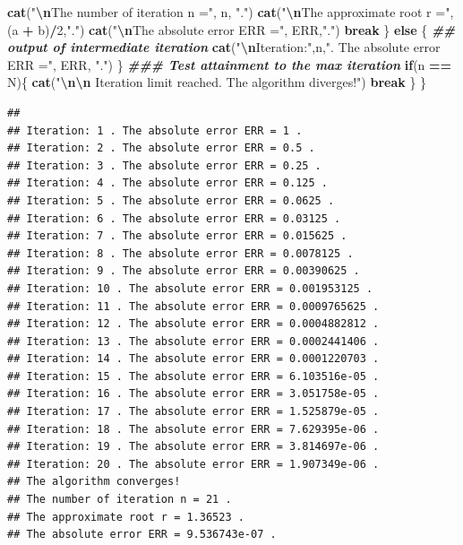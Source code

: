 \documentclass[
]{book}
\newenvironment{Shaded}{\begin{snugshade}}{\end{snugshade}}
\newcommand{\ControlFlowTok}[1]{\textcolor[rgb]{0.13,0.29,0.53}{\textbf{#1}}}
\newcommand{\DecValTok}[1]{\textcolor[rgb]{0.00,0.00,0.81}{#1}}
\newcommand{\DocumentationTok}[1]{\textcolor[rgb]{0.56,0.35,0.01}{\textbf{\textit{#1}}}}
\newcommand{\FunctionTok}[1]{\textcolor[rgb]{0.13,0.29,0.53}{\textbf{#1}}}
\newcommand{\NormalTok}[1]{#1}
\newcommand{\SpecialCharTok}[1]{\textcolor[rgb]{0.81,0.36,0.00}{\textbf{#1}}}
\newcommand{\StringTok}[1]{\textcolor[rgb]{0.31,0.60,0.02}{#1}}
\begin{document}
\begin{Shaded}
\begin{Highlighting}[]
    \FunctionTok{cat}\NormalTok{(}\StringTok{"}\SpecialCharTok{\textbackslash{}n}\StringTok{The number of iteration n ="}\NormalTok{, n, }\StringTok{"."}\NormalTok{)}
    \FunctionTok{cat}\NormalTok{(}\StringTok{"}\SpecialCharTok{\textbackslash{}n}\StringTok{The approximate root r ="}\NormalTok{, (a }\SpecialCharTok{+}\NormalTok{ b)}\SpecialCharTok{/}\DecValTok{2}\NormalTok{,}\StringTok{"."}\NormalTok{)}
    \FunctionTok{cat}\NormalTok{(}\StringTok{"}\SpecialCharTok{\textbackslash{}n}\StringTok{The absolute error ERR ="}\NormalTok{, ERR,}\StringTok{"."}\NormalTok{)}
    \ControlFlowTok{break}
\NormalTok{  \} }\ControlFlowTok{else}\NormalTok{ \{            }\DocumentationTok{\#\# output of intermediate iteration}
    \FunctionTok{cat}\NormalTok{(}\StringTok{"}\SpecialCharTok{\textbackslash{}n}\StringTok{Iteration:"}\NormalTok{,n,}\StringTok{". The absolute error ERR ="}\NormalTok{, ERR, }\StringTok{"."}\NormalTok{)  }
\NormalTok{    \}}
  \DocumentationTok{\#\#\# Test attainment to the max iteration}
  \ControlFlowTok{if}\NormalTok{(n }\SpecialCharTok{==}\NormalTok{ N)\{ }
    \FunctionTok{cat}\NormalTok{(}\StringTok{"}\SpecialCharTok{\textbackslash{}n\textbackslash{}n}\StringTok{ Iteration limit reached. The algorithm diverges!"}\NormalTok{)}
    \ControlFlowTok{break}
\NormalTok{  \}}
\NormalTok{\}}
\end{Highlighting}
\end{Shaded}

\begin{verbatim}
## 
## Iteration: 1 . The absolute error ERR = 1 .
## Iteration: 2 . The absolute error ERR = 0.5 .
## Iteration: 3 . The absolute error ERR = 0.25 .
## Iteration: 4 . The absolute error ERR = 0.125 .
## Iteration: 5 . The absolute error ERR = 0.0625 .
## Iteration: 6 . The absolute error ERR = 0.03125 .
## Iteration: 7 . The absolute error ERR = 0.015625 .
## Iteration: 8 . The absolute error ERR = 0.0078125 .
## Iteration: 9 . The absolute error ERR = 0.00390625 .
## Iteration: 10 . The absolute error ERR = 0.001953125 .
## Iteration: 11 . The absolute error ERR = 0.0009765625 .
## Iteration: 12 . The absolute error ERR = 0.0004882812 .
## Iteration: 13 . The absolute error ERR = 0.0002441406 .
## Iteration: 14 . The absolute error ERR = 0.0001220703 .
## Iteration: 15 . The absolute error ERR = 6.103516e-05 .
## Iteration: 16 . The absolute error ERR = 3.051758e-05 .
## Iteration: 17 . The absolute error ERR = 1.525879e-05 .
## Iteration: 18 . The absolute error ERR = 7.629395e-06 .
## Iteration: 19 . The absolute error ERR = 3.814697e-06 .
## Iteration: 20 . The absolute error ERR = 1.907349e-06 .
## The algorithm converges!
## The number of iteration n = 21 .
## The approximate root r = 1.36523 .
## The absolute error ERR = 9.536743e-07 .
\end{verbatim}
\end{document}
